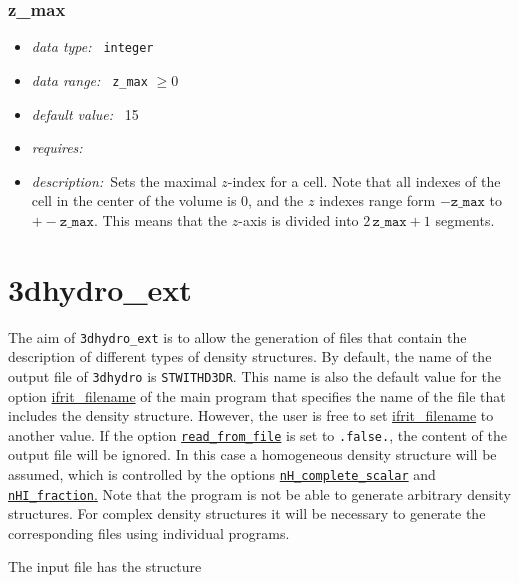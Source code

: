\documentclass[a4paper,10pt]{article}
\begin{document}
\subsubsection{z\_max}
\label{opt:zmax}
\begin{itemize}
 \item \textit{data type:~} \texttt{integer}
 \item \textit{data range:~} \texttt{z\_max} $\ge0$
 \item \textit{default value:~} 15
 \item \textit{requires:~}
 \item \textit{description:~}Sets the maximal $z$-index for a cell. Note that
  all indexes of the cell in the center of the volume is 0, and the  $z$ 
  indexes range form $-\mathtt{z\_max}$ to $+-\mathtt{z\_max}$. This means that 
  the $z$-axis is divided into $2\, \mathtt{z\_max} +1$ segments.
\end{itemize}


\section{3dhydro\_ext}
\label{util:3dhydro_ext}
The aim of  \texttt{3dhydro\_ext} is to allow the generation of files that 
contain the description of different types of density structures.
By default, the name of the output file of \texttt{3dhydro} is 
\texttt{STWITHD3DR}. This name is also the default value for the option 
\hyperref[opt:ifritfilename]{ifrit\_filename} of the main program that specifies 
the name of the file that includes the density structure. However, the user is 
free to set 
\hyperref[opt:ifritfilename]{ifrit\_filename} to another value. If the option 
\hyperref[opt:readfromfile]{\texttt{read\_from\_file}} is set to 
\texttt{.false.},
the content of the output file will be ignored. In this case a homogeneous  
density structure will be assumed, which is controlled by the options 
\hyperref[opt:nhcompletescalar]{\texttt{nH\_complete\_scalar}}
and \hyperref[opt:nhifraction]{\texttt{nHI\_fraction}.}
Note that the program is not be able to generate arbitrary density structures.  
For complex density structures it will be necessary to generate the 
corresponding files using individual programs.

The input file has the structure
\begin{center}
\end{center}
\end{document}
